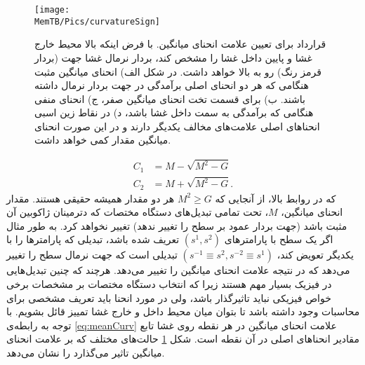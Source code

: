 \begin{figure}[t]
\begin{center}
\texttt{[image: \\MemTB/Pics/curvatureSign]}
\caption{
قرارداد برای تعیین علامت انحنای میانگین. با فرض اینکه بالا محیط خارج غشا و پایین داخل غشا را مشخص کند، بردار نرمال غشا جهت (بردار قرمز رنگ) رو به بالا خواهد داشت. در شکل الف) انحنای میانگین مثبت هنگامی که هر دو انحنای اصلی برآمدگی در جهت بردار نرمال داشته باشند. ب) برای قسمت تخت انحنای میانگین صفر، ج) انحنای منفی هنگامی که  برآمدگی به سمت داخل غشا باشد، د) در نقاط زین اسبی انحناهای اصلی علامت‌های مخالف یکدیگر دارند و در این صورت انحنای میانگین مقدار کمی خواهد داشت.
}
\label{fig:curvatureSign}
\end{center}
\end{figure}

\begin{equation}
\begin{aligned}
C_1&=M-\sqrt{M^2-G}\\
C_2&=M+\sqrt{M^2-G}.
\label{eq:gaussianCurv}
\end{aligned}
\end{equation}
که در روابط بالا، از آنجایی که 
$M^2\geq G$
\cite{Seifert1991}
 هر دو مقدار همیشه حقیقی هستند. مقدار انحنای میانگین، 
 $M$،
 تحت تمامی تبدیل‌های دستگاه مختصات که دترمینان ژاکوبین آن مثبت باشد (جهت بردار عمود بر سطح را تغییر ندهد) تغییر نخواهد کرد. به طور مثال اگر یک سطح با پارامتر‌های 
 $(s^1,s^2)$
 تعریف شده باشد، تبدیلی که پارامتر‌ها را با یکدیگر تعویض کند، 
 $(s^{-1}\equiv s^2,s^{-2}\equiv s^1)$
 تبدیلی است که جهت نرمال سطح را تغییر می‌دهد که در نتیجه علامت انحنای میانگین را تغییر می‌دهد. هرچند که چنین تبدیل‌هایی در فیزیک بسیار مهم هستند زیرا که انتخاب دستگاه مختصات بر مشخصات برخی خواص فیزیکی نباید تاثیرگذار باشد، ولی در مورد انحنا باید تعریف مشخصی برای محاسبات وجود داشته باشد تا بتوان میان محیط داخل و خارج غشا تمییز قائل بشویم. با توجه به رابطه‌ی
 \ref{eq:meanCurv}
 علامت انحنای میانگین در هر نقطه روی غشا تابع مقادیر انحناهای اصلی در آن نقطه‌ است. شکل 
 \ref{fig:curvatureSign}
 حالت‌های مختلف که بر علامت انحنای میانگین تاثیر می‌گذارد را نشان می‌دهد. 

